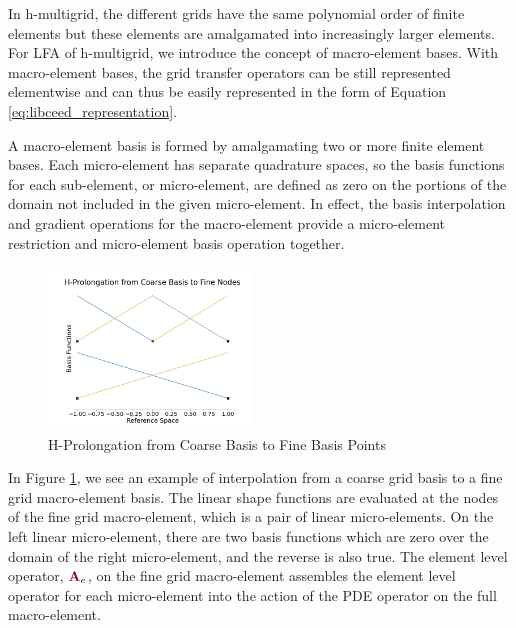 In h-multigrid, the different grids have the same polynomial order of finite elements but these elements are amalgamated into increasingly larger elements.
For LFA of h-multigrid, we introduce the concept of macro-element bases.
With macro-element bases, the grid transfer operators can be still represented elementwise and can thus be easily represented in the form of Equation \ref{eq:libceed_representation}.

A macro-element basis is formed by amalgamating two or more finite element bases.
Each micro-element has separate quadrature spaces, so the basis functions for each sub-element, or micro-element, are defined as zero on the portions of the domain not included in the given micro-element.
In effect, the basis interpolation and gradient operations for the macro-element provide a micro-element restriction and micro-element basis operation together.

\begin{figure}[!ht]
  \centering
  \includegraphics[width=0.48\textwidth]{../img/hProlongation}
  \caption{H-Prolongation from Coarse Basis to Fine Basis Points}
  \label{fig:h_prolongation}
\end{figure}

In Figure \ref{fig:h_prolongation}, we see an example of interpolation from a coarse grid basis to a fine grid macro-element basis.
The linear shape functions are evaluated at the nodes of the fine grid macro-element, which is a pair of linear micro-elements.
On the left linear micro-element, there are two basis functions which are zero over the domain of the right micro-element, and the reverse is also true.
The element level operator, ${\color{burgundy}\mathbf{A}}_e$, on the fine grid macro-element assembles the element level operator for each micro-element into the action of the PDE operator on the full macro-element.

